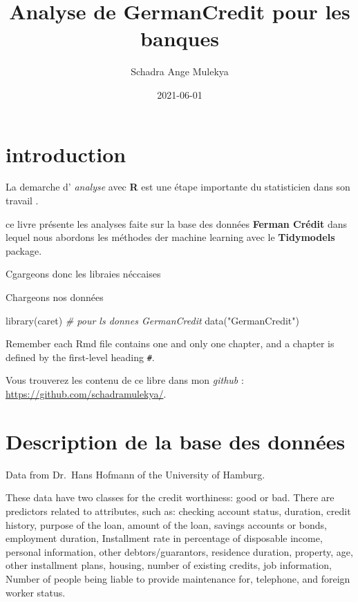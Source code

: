 \documentclass[
]{book}
\title{Analyse de GermanCredit pour les banques}
\author{Schadra Ange Mulekya}
\date{2021-06-01}
\newenvironment{Shaded}{\begin{snugshade}}{\end{snugshade}}
\newcommand{\CommentTok}[1]{\textcolor[rgb]{0.56,0.35,0.01}{\textit{#1}}}
\newcommand{\FunctionTok}[1]{\textcolor[rgb]{0.00,0.00,0.00}{#1}}
\newcommand{\NormalTok}[1]{#1}
\newcommand{\StringTok}[1]{\textcolor[rgb]{0.31,0.60,0.02}{#1}}
\begin{document}
\maketitle

{
\setcounter{tocdepth}{1}
\tableofcontents
}
\hypertarget{introduction}{%
\chapter{introduction}\label{introduction}}

La demarche d' \emph{analyse} avec \textbf{R} est une étape importante du statisticien dans son travail .

ce livre présente les analyses faite sur la base des données \textbf{Ferman Crédit} dans lequel nous abordons les méthodes der machine learning avec le \textbf{Tidymodels} package.

Cgargeons donc les libraies néccaises

Chargeons nos données

\begin{Shaded}
\begin{Highlighting}[]
\FunctionTok{library}\NormalTok{(caret) }\CommentTok{\# pour ls donnes GermanCredit}
\FunctionTok{data}\NormalTok{(}\StringTok{"GermanCredit"}\NormalTok{)}
\end{Highlighting}
\end{Shaded}

Remember each Rmd file contains one and only one chapter, and a chapter is defined by the first-level heading \texttt{\#}.

Vous trouverez les contenu de ce libre dans mon \emph{github} : \url{https://github.com/schadramulekya/}.

\hypertarget{intro}{%
\chapter{Description de la base des données}\label{intro}}

Data from Dr.~Hans Hofmann of the University of Hamburg.

These data have two classes for the credit worthiness: good or bad. There are predictors related to attributes, such as: checking account status, duration, credit history, purpose of the loan, amount of the loan, savings accounts or bonds, employment duration, Installment rate in percentage of disposable income, personal information, other debtors/guarantors, residence duration, property, age, other installment plans, housing, number of existing credits, job information, Number of people being liable to provide maintenance for, telephone, and foreign worker status.
\end{document}
